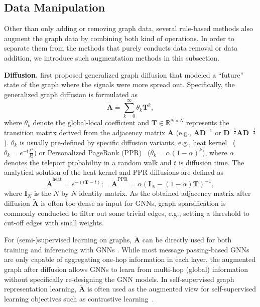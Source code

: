 \documentclass[11pt]{article}
\renewcommand\paragraph[1]{\vspace{0.05in} \noindent \textbf{#1.}}
\begin{document}
\subsection{Data Manipulation}
\label{sec:datamani}
Other than only adding or removing graph data, several rule-based methods also augment the graph data by combining both kind of operations. In order to separate them from the methods that purely conducts data removal or data addition, we introduce such augmentation methods in this subsection.

\paragraph{Diffusion}
\citet{klicpera2019diffusion} first proposed generalized graph diffusion that modeled a ``future'' state of the graph where the signals were more spread out. Specifically, the generalized graph diffusion is formulated as
\begin{equation}
    \tilde{\mathbf{A}} = \sum_{k=0}^{\infty}\theta_k\mathbf{T}^k,
\end{equation}
where $\theta_k$ denote the global-local coefficient and $\mathbf{T} \in \mathbb{R}^{N\times N}$ represents the transition matrix derived from the adjacency matrix $\mathbf{A}$ (e.g., $\mathbf{A}\mathbf{D}^{-1}$ or $\mathbf{D}^{-\frac{1}{2}}\mathbf{A}\mathbf{D}^{-\frac{1}{2}}$). 
$\theta_k$ is usually pre-defined by specific diffusion variants, e.g., heat kernel~\cite{kondor2002diffusion} ($\theta_k=e^{-t}\frac{t^k}{k!}$) or Personalized PageRank (PPR)~\cite{page1999pagerank} ($\theta_k = \alpha(1-\alpha)^k$), where $\alpha$ denotes the teleport probability in a random walk and $t$ is diffusion time. The analytical solution of the heat kernel and PPR diffusions are defined as
\begin{equation}
    \tilde{\mathbf{A}}^{\text{heat}} = e^{-(t\mathbf{T} - t)}; \quad
    \tilde{\mathbf{A}}^{\text{PPR}} = \alpha (\mathbf{I}_N - (1-\alpha)\mathbf{T})^{-1},
\end{equation}
where $\mathbf{I}_N$ is the $N$ by $N$ identity matrix. As the obtained adjacency matrix after diffusion $\tilde{\mathbf{A}}$ is often too dense as input for GNNs, graph sparsification is commonly conducted to filter out some trivial edges, e.g., setting a threshold to cut-off edges with small weights.

For (semi-)supervised learning on graphs, $\tilde{\mathbf{A}}$ can be directly used for both training and inferencing with GNNs \cite{klicpera2019diffusion}. While most message passing-based GNNs are only capable of aggregating one-hop information in each layer, the augmented graph after diffusion allows GNNs to learn from multi-hop (global) information without specifically re-designing the GNN models. In self-supervised graph representation learning, $\tilde{\mathbf{A}}$ is often used as the augmented view for self-supervised learning objectives such as contrastive learning~\cite{hassani2020contrastive,yuan2021semi}.
\end{document}
